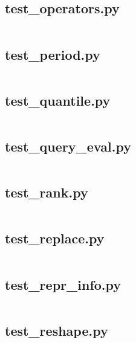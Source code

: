 \documentclass{article}
\begin{document}
\subsection{test\_operators.py}
\inputminted{python}{/home/dufferzafar/dev/@clones/pandas/pandas/tests/frame/test_operators.py}
\newpage

\subsection{test\_period.py}
\inputminted{python}{/home/dufferzafar/dev/@clones/pandas/pandas/tests/frame/test_period.py}
\newpage

\subsection{test\_quantile.py}
\inputminted{python}{/home/dufferzafar/dev/@clones/pandas/pandas/tests/frame/test_quantile.py}
\newpage

\subsection{test\_query\_eval.py}
\inputminted{python}{/home/dufferzafar/dev/@clones/pandas/pandas/tests/frame/test_query_eval.py}
\newpage

\subsection{test\_rank.py}
\inputminted{python}{/home/dufferzafar/dev/@clones/pandas/pandas/tests/frame/test_rank.py}
\newpage

\subsection{test\_replace.py}
\inputminted{python}{/home/dufferzafar/dev/@clones/pandas/pandas/tests/frame/test_replace.py}
\newpage

\subsection{test\_repr\_info.py}
\inputminted{python}{/home/dufferzafar/dev/@clones/pandas/pandas/tests/frame/test_repr_info.py}
\newpage

\subsection{test\_reshape.py}
\inputminted{python}{/home/dufferzafar/dev/@clones/pandas/pandas/tests/frame/test_reshape.py}
\newpage
\end{document}
